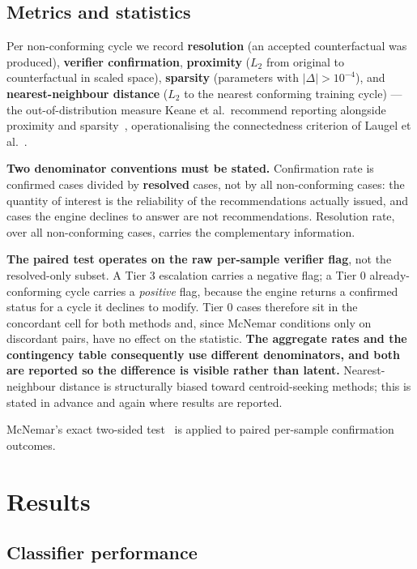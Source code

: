 \documentclass[11pt,a4paper]{article}
\begin{document}
\subsection{Metrics and statistics}

Per non-conforming cycle we record \textbf{resolution} (an accepted counterfactual was produced), \textbf{verifier confirmation}, \textbf{proximity} ($L_2$ from original to counterfactual in scaled space), \textbf{sparsity} (parameters with $|\Delta| > 10^{-4}$), and \textbf{nearest-neighbour distance} ($L_2$ to the nearest conforming training cycle) --- the out-of-distribution measure Keane et al.\ recommend reporting alongside proximity and sparsity~\cite{keane2021}, operationalising the connectedness criterion of Laugel et al.~\cite{laugel2019}.

\textbf{Two denominator conventions must be stated.} Confirmation rate is confirmed cases divided by \textbf{resolved} cases, not by all non-conforming cases: the quantity of interest is the reliability of the recommendations actually issued, and cases the engine declines to answer are not recommendations. Resolution rate, over all non-conforming cases, carries the complementary information.

\textbf{The paired test operates on the raw per-sample verifier flag}, not the resolved-only subset. A Tier 3 escalation carries a negative flag; a Tier 0 already-conforming cycle carries a \emph{positive} flag, because the engine returns a confirmed status for a cycle it declines to modify. Tier 0 cases therefore sit in the concordant cell for both methods and, since McNemar conditions only on discordant pairs, have no effect on the statistic. \textbf{The aggregate rates and the contingency table consequently use different denominators, and both are reported so the difference is visible rather than latent.} Nearest-neighbour distance is structurally biased toward centroid-seeking methods; this is stated in advance and again where results are reported.

McNemar's exact two-sided test~\cite{mcnemar1947} is applied to paired per-sample confirmation outcomes.

\section{Results}

\subsection{Classifier performance}
\end{document}

